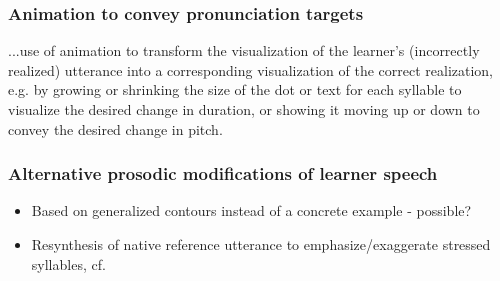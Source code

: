 	\subsubsection{Animation to convey pronunciation targets}
	...use of animation to transform the visualization of the learner's (incorrectly realized) utterance into a corresponding visualization of the correct realization, e.g. by growing or shrinking the size of the dot or text for each syllable to visualize the desired change in duration, or showing it moving up or down to convey the desired change in pitch.
	
	\subsubsection{Alternative prosodic modifications of learner speech}
	
	\begin{itemize}
	\item{Based on generalized contours instead of a concrete example - possible?}
	\item{Resynthesis of native reference utterance to emphasize/exaggerate stressed syllables, cf. \citep{Bissiri2006,Bissiri2009}}
	\end{itemize}